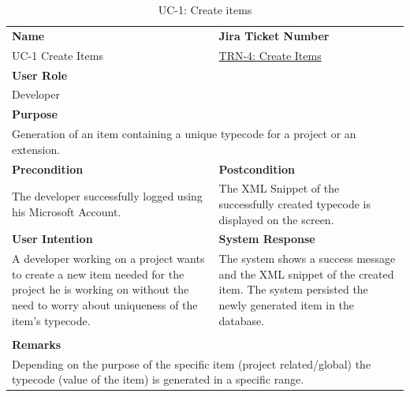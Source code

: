 \begin{table}[H]
    \centering
    \begin{tabular}{|p{}|p{}|}

        \hline
        \rowcolor{gray!50}\textbf{Name} & \rowcolor{gray!50}\textbf{Jira Ticket Number} \\
        UC-1 Create Items
        &
        \href{https://fh-burgenland.atlassian.net/browse/TRN-4}{TRN-4: Create Items} \\ \hline

        \multicolumn{2}{|l|}{\rowcolor{gray!50}\textbf{User Role}} \\
        \multicolumn{2}{|l|}{Developer} \\ \hline

        \multicolumn{2}{|l|}{\rowcolor{gray!50}\textbf{Purpose}} \\
        \multicolumn{2}{|l|}{Generation of an item containing a unique typecode for a project or an extension.} \\ \hline

        \rowcolor{gray!50}\textbf{Precondition} & \rowcolor{gray!50}\textbf{Postcondition} \\
        The developer successfully logged using his Microsoft Account.
         &
        The XML Snippet of the successfully created typecode is displayed on the screen. \\ \hline

        \rowcolor{gray!50}\textbf{User Intention} & \rowcolor{gray!50}\textbf{System Response} \\
        A developer working on a project wants to create a new item needed for the project he is working on without
        the need to worry about uniqueness of the item's typecode.
         &
        The system shows a success message and the XML snippet of the created item.
        The system persisted the newly generated item in the database.
        \\ \hline

         & \\ \hline

        \multicolumn{2}{|l|}{\rowcolor{gray!50}\textbf{Remarks}} \\
        \multicolumn{2}{|p{1\textwidth}|}{Depending on the purpose of the specific item (project related/global) the typecode (value of the item) is generated in a specific range.} \\ \hline
    \end{tabular}
    \caption{UC-1: Create items}
    \label{tab:uc-1_create-items}
\end{table}

